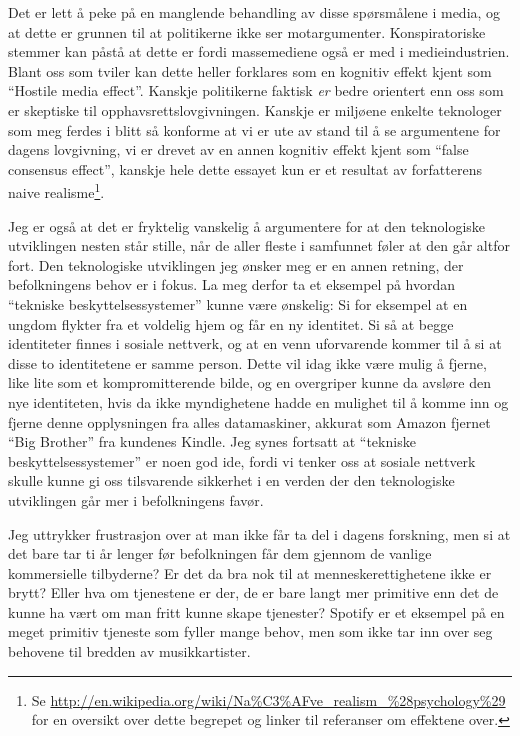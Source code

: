 \documentclass[11pt,norsk,a4paper]{article}
\begin{document}
Det er lett å peke på en manglende behandling av disse spørsmålene i
media, og at dette er grunnen til at politikerne ikke ser
motargumenter. Konspiratoriske stemmer kan påstå at dette er fordi
massemediene også er med i medieindustrien. Blant oss som tviler kan
dette heller forklares som en kognitiv effekt kjent som ``Hostile
media effect''. Kanskje politikerne faktisk \emph{er} bedre orientert
enn oss som er skeptiske til opphavsrettslovgivningen. Kanskje er
miljøene enkelte teknologer som meg ferdes i blitt så konforme at vi
er ute av stand til å se argumentene for dagens lovgivning, vi er
drevet av en annen kognitiv effekt kjent som ``false consensus
effect'', kanskje hele dette essayet kun er et resultat av
forfatterens naive
realisme\footnote{Se \url{http://en.wikipedia.org/wiki/Na\%C3\%AFve_realism_\%28psychology\%29}
for en oversikt over dette begrepet og linker til referanser om
effektene over.}.

Jeg er også at det er fryktelig vanskelig å argumentere for at
den teknologiske utviklingen nesten står stille, når de aller fleste i
samfunnet føler at den går altfor fort. Den teknologiske utviklingen
jeg ønsker meg er en annen retning, der befolkningens behov er i
fokus. La meg derfor ta et eksempel på hvordan ``tekniske
beskyttelsessystemer'' kunne være ønskelig: Si for eksempel at en ungdom
flykter fra et voldelig hjem og får en ny identitet. Si så at begge
identiteter finnes i sosiale nettverk, og at en venn uforvarende
kommer til å si at disse to identitetene er samme person. Dette vil
idag ikke være mulig å fjerne, like lite som et kompromitterende
bilde, og en overgriper kunne da avsløre den nye identiteten, hvis da
ikke myndighetene hadde en mulighet til å komme inn og fjerne denne
opplysningen fra alles datamaskiner, akkurat som Amazon fjernet ``Big
Brother'' fra kundenes Kindle. Jeg synes fortsatt at ``tekniske
beskyttelsessystemer'' er noen god ide, fordi vi tenker oss at sosiale
nettverk skulle kunne gi oss tilsvarende sikkerhet i en verden der den
teknologiske utviklingen går mer i befolkningens favør.

Jeg uttrykker frustrasjon over at man ikke får ta del i dagens
forskning, men si at det bare tar ti år lenger før befolkningen får
dem gjennom de vanlige kommersielle tilbyderne? Er det da bra nok til
at menneskerettighetene ikke er brytt? Eller hva om tjenestene er der,
de er bare langt mer primitive enn det de kunne ha vært om man fritt
kunne skape tjenester? Spotify er et eksempel på en meget
primitiv tjeneste som fyller mange behov, men som ikke tar inn over
seg behovene til bredden av musikkartister. 
\end{document}
